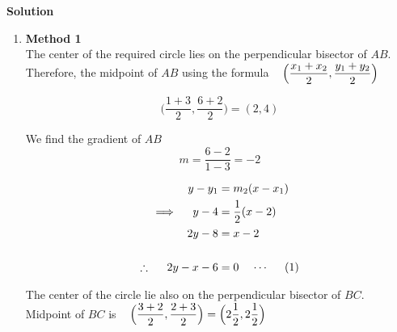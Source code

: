 \documentclass[11pt,a4paper]{article}
\begin{document}
\textbf{Solution}
\begin{enumerate}
\item[]\textbf{Method 1}\\
The center of the required circle lies on the perpendicular bisector of $AB$.\\

Therefore, the midpoint of $AB$ using the formula $\hspace{0.3cm}\Big(\dfrac{x_1 + x_2}{2}, \dfrac{y_1 + y_2}{2}\Big)$

$$\Big(\dfrac{1 + 3}{2},\dfrac{6 + 2}{2}\Big) = (2,4)$$

\begin{figure}[H]
\centering
{}
\end{figure}













We find the gradient of $AB$ 
$$m = \dfrac{6-2}{1-3} = -2$$

\begin{align*}
y - y_1 & = m_2 (x - x_1)\\
\implies\hspace{0.4cm} y - 4 & = \dfrac{1}{2}(x - 2)\\
2y -  8 &  = x - 2\\\\
\therefore\hspace{0.5cm} 2y - x - 6 & = 0\hspace{0.4cm}\cdots\hspace{0.5cm} (1)
\end{align*}



The center of the circle lie also on the perpendicular bisector of $BC$.\\

Midpoint  of $BC$ is $\hspace{0.3cm} \Big(\dfrac{3 + 2}{2}, \dfrac{2 + 3}{2}\Big) = \Big(2\dfrac{1}{2},2\dfrac{1}{2}\Big)$\\


\end{enumerate}
\end{document}
